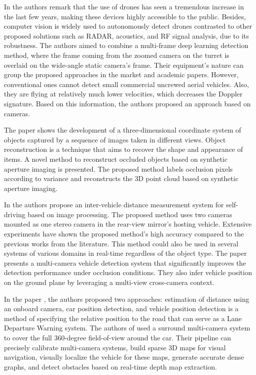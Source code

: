 In \cite{Unlu2019} the authors remark that the use of drones has seen a tremendous increase in the last few years, making these devices highly accessible to the public. Besides, computer vision is widely used to autonomously detect drones contrasted to other proposed solutions such as RADAR, acoustics, and RF signal analysis, due to its robustness. The authors aimed to combine a multi-frame deep learning detection method, where the frame coming from the zoomed camera on the turret is overlaid on the wide-angle static camera's frame. Their equipment's nature can group the proposed approaches in the market and academic papers. However, conventional ones cannot detect small commercial uncrewed aerial vehicles. Also, they are flying at relatively much lower velocities, which decreases the Doppler signature. Based on this information, the authors proposed an approach based on cameras.

The paper \cite{Pei2019} shows the development of a three-dimensional coordinate system of objects captured by a sequence of images taken in different views. Object reconstruction is a technique that aims to recover the shape and appearance of items. A novel method to reconstruct occluded objects based on synthetic aperture imaging is presented. The proposed method labels occlusion pixels according to variance and reconstructs the 3D point cloud based on synthetic aperture imaging.

In \cite{Zaarane2020} the authors propose an inter-vehicle distance measurement system for self-driving based on image processing. The proposed method uses two cameras mounted as one stereo camera in the rear-view mirror's hosting vehicle.  Extensive experiments have shown the proposed method's high accuracy compared to the previous works from the literature. This method could also be used in several systems of various domains in real-time regardless of the object type. The paper \cite{Wu2019} presents a multi-camera vehicle detection system that significantly improves the detection performance under occlusion conditions. They also infer vehicle position on the ground plane by leveraging a multi-view cross-camera context.

In the paper \cite{ Ali2016}, the authors proposed two approaches: estimation of distance using an onboard camera, car position detection, and vehicle position detection is a method of specifying the relative position to the road that can serve as a Lane Departure Warning system. The authors of \cite{Hane2017} used a surround multi-camera system to cover the full 360-degree field-of-view around the car. Their pipeline can precisely calibrate multi-camera systems, build sparse 3D maps for visual navigation, visually localize the vehicle for these maps, generate accurate dense graphs, and detect obstacles based on real-time depth map extraction.

